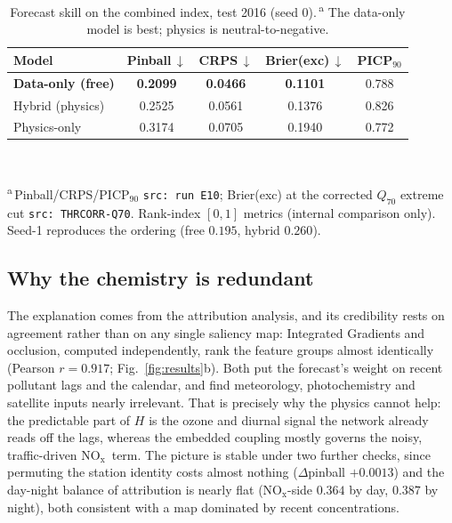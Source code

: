\documentclass[conference]{IEEEtran}
\newcommand{\nox}{\ensuremath{\mathrm{NO_x}}}
\begin{document}
\begin{table}[t]
\caption{Forecast skill on the combined index, test 2016 (seed 0).\,\textsuperscript{a}
The data-only model is best; physics is neutral-to-negative.}
\label{tab:skill}
\centering\footnotesize
\renewcommand{\arraystretch}{1.05}
\begin{tabular}{@{}lcccc@{}}
\toprule
Model & Pinball\,$\downarrow$ & CRPS\,$\downarrow$ & Brier(exc)\,$\downarrow$ & PICP$_{90}$\\
\midrule
\textbf{Data-only (free)} & \textbf{0.2099} & \textbf{0.0466} & \textbf{0.1101} & 0.788\\
Hybrid (physics) & 0.2525 & 0.0561 & 0.1376 & 0.826\\
Physics-only & 0.3174 & 0.0705 & 0.1940 & 0.772\\
\bottomrule
\end{tabular}
\\[2pt]
\raggedright\textsuperscript{a}\,Pinball/CRPS/PICP$_{90}$ \texttt{src: run E10}; Brier(exc) at the
corrected $Q_{70}$ extreme cut \texttt{src: THRCORR-Q70}. Rank-index $[0,1]$ metrics (internal comparison
only). Seed-1 reproduces the ordering (free $0.195$, hybrid $0.260$).
\end{table}

\subsection{Why the chemistry is redundant}\label{ssec:xai}
The explanation comes from the attribution analysis, and its credibility rests on agreement rather than
on any single saliency map: Integrated Gradients and occlusion, computed independently, rank the feature
groups almost identically (Pearson $r=0.917$; Fig.~\ref{fig:results}b). Both put the forecast's weight on
recent pollutant lags and the calendar, and find meteorology, photochemistry and satellite inputs nearly
irrelevant. That is precisely why the physics cannot help: the predictable part of $H$ is the ozone and
diurnal signal the network already reads off the lags, whereas the embedded coupling mostly governs the
noisy, traffic-driven \nox\ term. The picture is stable under two further checks, since permuting the
station identity costs almost nothing ($\Delta$pinball $+0.0013$) and the day-night balance of
attribution is nearly flat (\nox-side $0.364$ by day, $0.387$ by night), both consistent with a map
dominated by recent concentrations.

\end{document}

